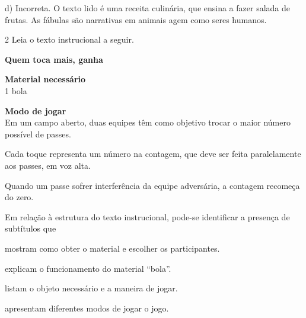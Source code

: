 \begin{escolha}
\begin{escolha}
{d) Incorreta. O texto lido é uma receita culinária, que ensina a fazer 
salada de frutas. As fábulas são narrativas em animais agem como seres
humanos.}

\num{2} Leia o texto instrucional a seguir.


\textbf{Quem toca mais, ganha}

\textbf{Material necessário}\\
1 bola

\textbf{Modo de jogar}\\
Em um campo aberto, duas equipes têm como
objetivo trocar o maior número possível de passes.

Cada toque representa um número na contagem, que deve ser feita
paralelamente aos passes, em voz alta.

Quando um passe sofrer interferência da equipe adversária, a contagem
recomeça do zero.


Em relação à estrutura do texto instrucional, pode-se identificar a
presença de subtítulos que

\begin{escolha}
\item mostram como obter o material e escolher os participantes.

\item explicam o funcionamento do material ``bola''.

\item listam o objeto necessário e a maneira de jogar.

\item apresentam diferentes modos de jogar o jogo.
\end{escolha}

\end{escolha}
\end{escolha}
